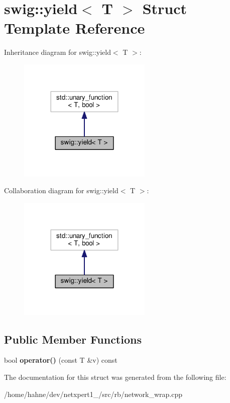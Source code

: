 \hypertarget{structswig_1_1yield}{}\section{swig\+:\+:yield$<$ T $>$ Struct Template Reference}
\label{structswig_1_1yield}


Inheritance diagram for swig\+:\+:yield$<$ T $>$\+:
\nopagebreak
\begin{figure}[H]
\begin{center}
\leavevmode
\includegraphics[width=180pt]{structswig_1_1yield__inherit__graph}
\end{center}
\end{figure}


Collaboration diagram for swig\+:\+:yield$<$ T $>$\+:
\nopagebreak
\begin{figure}[H]
\begin{center}
\leavevmode
\includegraphics[width=180pt]{structswig_1_1yield__coll__graph}
\end{center}
\end{figure}
\subsection*{Public Member Functions}
\begin{DoxyCompactItemize}
\item 
bool {\bfseries operator()} (const T \&v) const \hypertarget{structswig_1_1yield_a78a1d4d335e56e8eec2d2a2171c522c4}{}\label{structswig_1_1yield_a78a1d4d335e56e8eec2d2a2171c522c4}

\end{DoxyCompactItemize}


The documentation for this struct was generated from the following file\+:\begin{DoxyCompactItemize}
\item 
/home/hahne/dev/netxpert1\+\_/src/rb/network\+\_\+wrap.\+cpp\end{DoxyCompactItemize}
